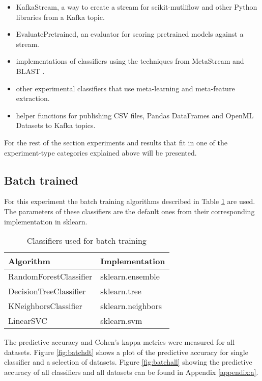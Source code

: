 \documentclass{sig-alternate-br}
\begin{document}
\begin{itemize}
    \item KafkaStream, a way to create a stream for scikit-mutliflow and other Python libraries from a Kafka topic.
    \item EvaluatePretrained, an evaluator for scoring pretrained models against a stream.
    \item implementations of classifiers using the techniques from MetaStream \cite{rossi2014metastream} and BLAST \cite{van2018online}.
    \item other experimental classifiers that use meta-learning and meta-feature extraction.
    \item helper functions for publishing CSV files, Pandas DataFrames and OpenML Datasets to Kafka topics.
\end{itemize}

For the rest of the section experiments and results that fit in one of the experiment-type categories explained above will be presented.

\subsection{Batch trained}

For this experiment the batch training algorithms described in Table \ref{table:batch_algos} are used. The parameters of these classifiers are the default ones from their corresponding implementation in sklearn. 

\begin{table}[h]
\centering
\renewcommand{\arraystretch}{1.25}
\begin{tabular}{|l|l|} \hline
\textbf{Algorithm} & \textbf{Implementation}\\ \hline
RandomForestClassifier & sklearn.ensemble \\ \hline
DecisionTreeClassifier & sklearn.tree \\ \hline
KNeighborsClassifier & sklearn.neighbors \\ \hline
LinearSVC & sklearn.svm \\ \hline
\end{tabular}
\caption{Classifiers used for batch training}
\label{table:batch_algos}
\end{table}

The predictive accuracy and Cohen's kappa metrics were measured for all datasets. Figure \ref{fig:batchdt} shows a plot of the predictive accuracy for single classifier and a selection of datasets. Figure \ref{fig:batchall} showing the predictive accuracy of all classifiers and all datasets can be found in Appendix \ref{appendix:a}.
\end{document}
